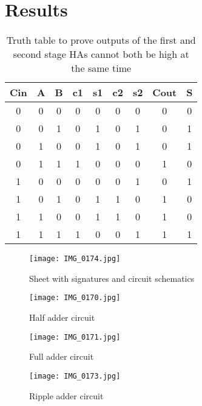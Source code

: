 \documentclass[11pt]{article}
\begin{document}
\section*{Results}

\begin{table}[ht]\centering
	\caption{Truth table to prove outputs of the first and second stage HAs cannot both be high at the same time}
	\label{tbl:example_table}
	\begin{tabular}{ccc|cccc|cc}
		\toprule
		Cin & A & B & c1 & s1 & c2 & s2 & Cout & S \\
		\midrule
		0 & 0 & 0 & 0 & 0 & 0 & 0 & 0 & 0 \\
		0 & 0 & 1 & 0 & 1 & 0 & 1 & 0 & 1 \\
		0 & 1 & 0 & 0 & 1 & 0 & 1 & 0 & 1 \\
		0 & 1 & 1 & 1 & 0 & 0 & 0 & 1 & 0 \\
		1 & 0 & 0 & 0 & 0 & 0 & 1 & 0 & 1 \\
		1 & 0 & 1 & 0 & 1 & 1 & 0 & 1 & 0 \\
		1 & 1 & 0 & 0 & 1 & 1 & 0 & 1 & 0 \\
		1 & 1 & 1 & 1 & 0 & 0 & 1 & 1 & 1 \\
		\bottomrule
	\end{tabular} 
\end{table}

\begin{figure}[ht]\centering
	\texttt{[image: IMG\_0174.jpg]}
	\caption{Sheet with signatures and circuit schematics}
	\label{fig:another_image}		%
\end{figure}

\begin{figure}[ht]\centering
	\texttt{[image: IMG\_0170.jpg]}
	\caption{Half adder circuit}
	\label{fig:another_image}		%
\end{figure}

\begin{figure}[ht]\centering
	\texttt{[image: IMG\_0171.jpg]}
	\caption{Full adder circuit}
	\label{fig:another_image}		%
\end{figure}

\begin{figure}[ht]\centering
\texttt{[image: IMG\_0173.jpg]}
\caption{Ripple adder circuit}
\label{fig:another_image}		%
\end{figure}
\end{document}
